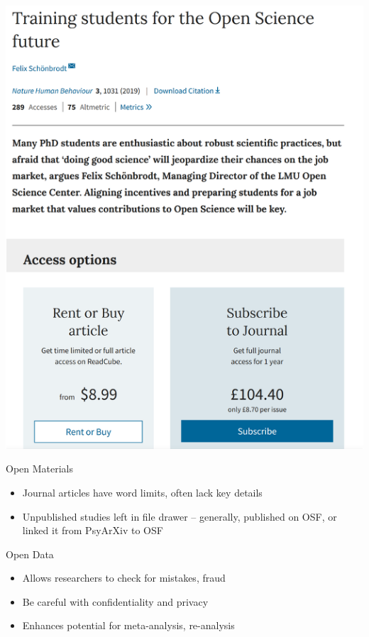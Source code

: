 \documentclass[
  ignorenonframetext,
  aspectratio=169,
]{beamer}
\providecommand{\tightlist}{%
  \setlength{\itemsep}{0pt}\setlength{\parskip}{0pt}}\usepackage{longtable,booktabs,array}
\begin{document}
\begin{frame}{}
\label{section}
\begin{center}
\includegraphics{figs/paid-os.png}
\end{center}
\end{frame}

\begin{frame}{Open Materials}
\label{open-materials}
\begin{itemize}
\tightlist
\item
  Journal articles have word limits, often lack key details
\item
  Unpublished studies left in file drawer -- generally, published on
  OSF, or linked it from PsyArXiv to OSF
\end{itemize}
\end{frame}

\begin{frame}{Open Data}
\label{open-data}
\begin{itemize}
\tightlist
\item
  Allows researchers to check for mistakes, fraud
\item
  Be careful with confidentiality and privacy
\item
  Enhances potential for meta-analysis, re-analysis
\end{itemize}
\end{frame}
\end{document}
